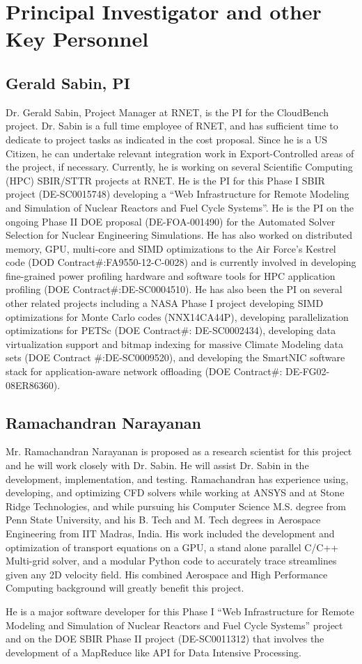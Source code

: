 \section{Principal Investigator and other Key Personnel}

\subsection{Gerald Sabin, PI}
Dr. Gerald Sabin, Project Manager at RNET, is the PI for the
CloudBench project. Dr.  Sabin is a full time employee of RNET, and
has sufficient time to dedicate to project tasks as indicated in the
cost proposal. Since he is a US Citizen, he can undertake relevant
integration work in Export-Controlled areas of the project, if
necessary. Currently, he is working on several Scientific Computing
(HPC) SBIR/STTR projects at RNET. He is the PI for this Phase I SBIR
project (DE-SC0015748) developing a ``Web Infrastructure for Remote
Modeling and Simulation of Nuclear Reactors and Fuel Cycle
Systems''. He is the PI on the ongoing Phase II DOE proposal
(DE-FOA-001490) for the Automated Solver Selection for Nuclear
Engineering Simulations. He has also worked on distributed memory,
GPU, multi-core and SIMD optimizations to the Air Force's Kestrel code
(DOD Contract\#:FA9550-12-C-0028) and is currently involved in
developing fine-grained power profiling hardware and software tools
for HPC application profiling (DOE Contract\#:DE-SC0004510). He has
also been the PI on several other related projects including a NASA
Phase I project developing SIMD optimizations for Monte Carlo codes
(NNX14CA44P), developing parallelization optimizations for PETSc (DOE
Contract\#: DE-SC0002434), developing data virtualization support and
bitmap indexing for massive Climate Modeling data sets (DOE Contract
\#:DE-SC0009520), and developing the SmartNIC software stack for
application-aware network offloading (DOE Contract\#:
DE-FG02-08ER86360).

\subsection{Ramachandran Narayanan}
Mr. Ramachandran Narayanan is proposed as a research scientist for
this project and he will work closely with Dr. Sabin. He will assist
Dr. Sabin in the development, implementation, and
testing. Ramachandran has experience using, developing, and optimizing
CFD solvers while working at ANSYS and at Stone Ridge Technologies,
and while pursuing his Computer Science M.S. degree from Penn State
University, and his B. Tech and M. Tech degrees in Aerospace
Engineering from IIT Madras, India. His work included the development
and optimization of transport equations on a GPU, a stand alone
parallel C/C++ Multi-grid solver, and a modular Python code to
accurately trace streamlines given any 2D velocity field. His combined
Aerospace and High Performance Computing background will greatly
benefit this project.

He is a major software developer for this Phase I ``Web Infrastructure
for Remote Modeling and Simulation of Nuclear Reactors and Fuel Cycle
Systems'' project and on the DOE SBIR Phase II project (DE-SC0011312)
that involves the development of a MapReduce like API for Data
Intensive Processing.
